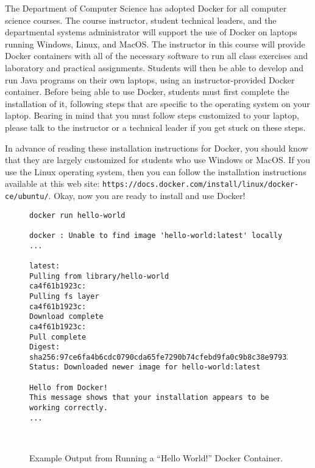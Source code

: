 \documentclass[11pt]{article}
\newcommand{\url}[1]{\lstinline{#1}}
\begin{document}
The Department of Computer Science has adopted Docker for all computer science
courses. The course instructor, student technical leaders, and the departmental
systems administrator will support the use of Docker on laptops running
Windows, Linux, and MacOS. The instructor in this course will provide Docker
containers with all of the necessary software to run all class exercises and
laboratory and practical assignments. Students will then be able to develop and
run Java programs on their own laptops, using an instructor-provided Docker
container. Before being able to use Docker, students must first complete the
installation of it, following steps that are specific to the operating system
on your laptop. Bearing in mind that you must follow steps customized to your
laptop, please talk to the instructor or a technical leader if you get stuck on
these steps.

In advance of reading these installation instructions for Docker, you should
know that they are largely customized for students who use Windows or MacOS. If
you use the Linux operating system, then you can follow the installation
instructions available at this web site:
\url{https://docs.docker.com/install/linux/docker-ce/ubuntu/}. Okay, now you are
ready to install and use Docker!

\begin{figure}

\begin{verbatim}
docker run hello-world

docker : Unable to find image 'hello-world:latest' locally
...

latest:
Pulling from library/hello-world
ca4f61b1923c:
Pulling fs layer
ca4f61b1923c:
Download complete
ca4f61b1923c:
Pull complete
Digest: sha256:97ce6fa4b6cdc0790cda65fe7290b74cfebd9fa0c9b8c38e979330d547d22ce1
Status: Downloaded newer image for hello-world:latest

Hello from Docker!
This message shows that your installation appears to be working correctly.
...
\end{verbatim}

\vspace*{-.25in}
\caption{Example Output from Running a ``Hello World!''  Docker Container.}~\label{fig:docker}
\vspace*{-.25in}
\end{figure}

\end{document}
